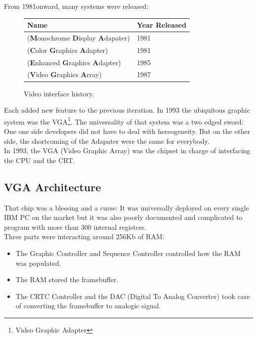 \documentclass[book.tex]{subfiles}
\begin{document}
From 1981onward, many systems were released:
\bigskip
  
 \begin{figure}[H]
\centering  
\begin{tabularx}{0.9\textwidth}{ X  Y }
  \toprule
  \textbf{Name} &  \textbf{Year Released} \\
  \toprule {}
   (\textbf{M}onochrome
   \textbf{D}isplay
   \textbf{A}dapater) & 1981 
   \\ 
   (\textbf{C}olor
   \textbf{G}raphics
   \textbf{A}dapter) & 1981 
    \\ 
   (\textbf{E}nhanced
   \textbf{G}raphics
   \textbf{A}dapter) & 1985
   \\ 
   (\textbf{V}ideo
   \textbf{G}raphics
   \textbf{A}rray)  & 1987
    \\
  \toprule
\end{tabularx}
\caption{Video interface history.}\label{fig:vga_history}
\end{figure}

Each added new feature to the previous iteration. In 1993 the ubiquitous graphic system was the VGA\footnote{Video Graphic Adapter}. The universality of that system was a two edged sword: One one side developers did not have to deal with hereogeneity. But on the other side, the shortcoming of the Adapater were the same for everybody.\\

In 1993, the VGA (Video Graphic Array) was the chipset in charge of interfacing the CPU and the CRT.


\subsection{VGA Architecture}

That chip was a blessing and a curse: It was universally deployed on every single IBM PC on the market but it was also poorly documented and complicated to program with more than 300 internal registers.\\
\bigskip
  Three parts were interacting around 256Kb of RAM:

\begin{itemize}
\item The Graphic Controller and Sequence Controller controlled how the RAM was populated.
\item The RAM stored the framebuffer.
\item The CRTC Controller and the DAC (Digital To Analog Converter) took care of converting the framebuffer to analogic signal.
\end{itemize}
\end{document}
